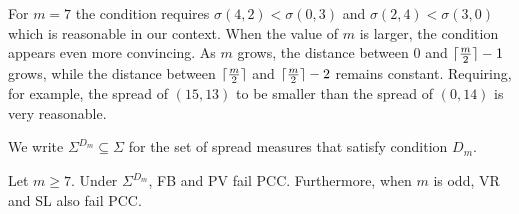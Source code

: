 \documentclass[pagesize, twoside=off, bibliography=totoc, DIV=calc, fontsize=12pt, a4paper]{scrartcl}
\begin{document}
For $m=7$ the condition requires $\sigma(4, 2) < \sigma(0, 3)$ and $\sigma(2, 4) < \sigma(3, 0)$ which is reasonable in our context. When the value of $m$ is larger, the condition appears even more convincing. As $m$ grows, the distance between $0$ and $\lceil\frac{m}{2}\rceil - 1$ grows, while the distance between $\lceil\frac{m}{2}\rceil$ and $\lceil\frac{m}{2}\rceil - 2$ remains constant. Requiring, for example, the spread of $(15, 13)$ to be smaller than the spread of $(0, 14)$ is very reasonable.

We write $\Sigma^{D_{m}} \subseteq \Sigma$ for the set of spread measures that satisfy condition $D_{m}$. 

\begin{theorem} \label{th:2votPCC}
	Let $m \geq 7$. Under $\Sigma^{D_{m}}$, FB and PV fail PCC. Furthermore, when $m$ is odd, VR and SL also fail PCC.
\end{theorem}
\end{document}
